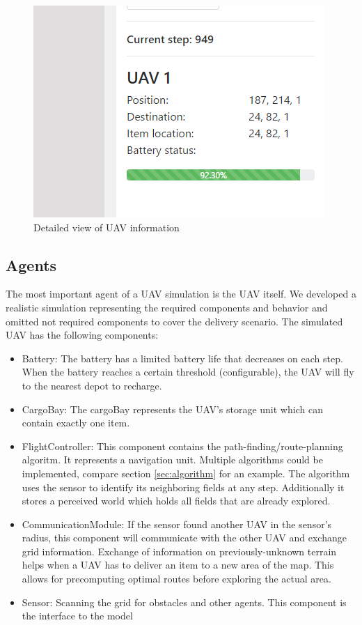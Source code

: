 	\begin{figure}[htbp]\label{fig:uav_detail}
		\centering
		\includegraphics[scale=0.5]{images/uav_detail.png}
		\caption{Detailed view of UAV information}
	\end{figure}


\subsection{Agents}\label{sec:UAV}
The most important agent of a UAV simulation is the UAV itself. We developed a realistic simulation representing the required components and behavior and omitted not required components to cover the delivery scenario. The simulated UAV has the following components:
	\begin{itemize}
			\item Battery: The battery has a limited battery life that decreases on each step. When the battery reaches a certain threshold (configurable), the UAV will fly to the nearest depot to recharge.
					\item CargoBay: The cargoBay represents the UAV's storage unit which can contain exactly one item.
		\item FlightController: This component contains the path-finding/route-planning algoritm. It represents a navigation unit. Multiple algorithms could be implemented, compare section \ref{sec:algorithm} for an example. The algorithm uses the sensor to identify its neighboring fields at any step. Additionally it stores a perceived world which holds all fields that are already explored. 
		\item CommunicationModule: If the sensor found another UAV in the sensor's radius, this component will communicate with the other UAV and exchange grid information. Exchange of information on previously-unknown terrain helps when a UAV has to deliver an item to a new area of the map. This allows for precomputing optimal routes before exploring the actual area.
		\item Sensor: Scanning the grid for obstacles and other agents. This component is the interface to the model
	\end{itemize}

